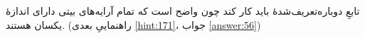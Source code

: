 \section{}
\paragraph{}\label{hint:250}
تابعِ دوباره‌تعریف‌شدهٔ  باید کار کند چون واضح است که تمام آرایه‌های بیتی دارای اندازهٔ یکسان هستند. (راهنماییِ بعدی \ref{hint:171}، جواب \ref{answer:56})